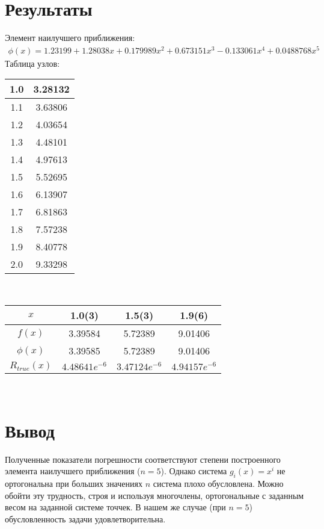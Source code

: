 \documentclass[10pt]{scrartcl}
\begin{document}
\section*{Результаты}\noindent
Элемент наилучшего приближения:
\begin{gather*}
\phi(x) = 1.23199 + 1.28038x + 0.179989x^2 + 0.673151x^3 - 0.133061x^4 + 0.0488768x^5 
\end{gather*}
Таблица узлов:\\
\begin{table}[h]
\begin{tabular}{|c|c|}
\hline
1.0 & 3.28132 \\
\hline
1.1 & 3.63806 \\
\hline
1.2 & 4.03654\\
\hline 
1.3 & 4.48101\\
\hline 
1.4 & 4.97613\\
\hline 
1.5 & 5.52695\\
\hline 
1.6 & 6.13907\\
\hline 
1.7 & 6.81863\\
\hline 
1.8 & 7.57238\\
\hline 
1.9 & 8.40778\\
\hline 
2.0 & 9.33298\\
\hline 
\end{tabular}
\end{table}\\
\begin{table}[h]
\begin{tabular}{|c|c|c|c|}
\hline
$x$ 			& 1.0(3) 			& 1.5(3) 			& 1.9(6)  			\\
\hline
$f(x)$ 			& 3.39584 			& 5.72389 			& 9.01406 			\\
\hline 
$\phi(x)$ 		& 3.39585 			& 5.72389 			& 9.01406 			\\
\hline 
$R_{true}(x)$ 	& $4.48641e^{-6}$ 	& $3.47124e^{-6}$ 	& $4.94157e^{-6}$	\\
\hline 
\end{tabular}
\end{table}\\
\section*{Вывод}\noindent
Полученные показатели погрешности соответствуют степени построенного элемента наилучшего приближения ($n = 5$).
Однако система $g_i(x) = x^i$ не ортогональна при больших значениях  $n$ система плохо обусловлена.
Можно обойти эту трудность, строя и используя многочлены, ортогональные с заданным весом на заданной системе
точчек. В нашем же случае (при $n = 5$) обусловленность задачи удовлетворительна.
\end{document}
